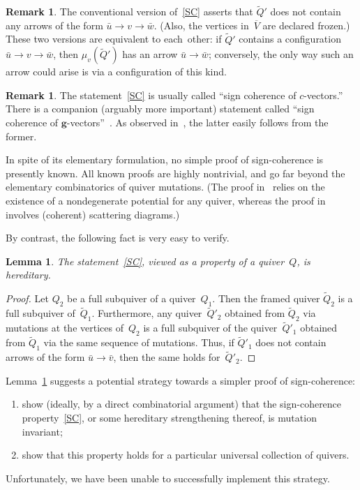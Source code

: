 \documentclass[10pt]{amsart}
\newtheorem{lemma}[theorem]{Lemma}
\theoremstyle{definition}
\newtheorem{remark}[theorem]{Remark}
\begin{document}

\begin{remark}
The conventional version of~\ref{SC} asserts that $\widetilde Q'$ does not contain any 
arrows of the form $\bar u\to v\to \bar w$. 
(Also, the vertices in~$\overline V$ are declared frozen.) 
These two versions are equivalent to each~other: 
if $\widetilde Q'$ contains a configuration $\bar u\to v\to \bar w$,
then $\mu_v(\widetilde Q')$ has an arrow $\bar u\to \bar w$; conversely, 
the only way such an arrow could arise is via a configuration of this kind. 
\end{remark}

\begin{remark}
The statement~\ref{SC} is usually called ``sign coherence of $c$-vectors.''
There is a companion (arguably more important) statement called
``sign coherence of $\mathbf{g}$-vectors''~\cite{ca4}. 
As observed in~\cite{nakanishi-zelevinsky}, the latter easily follows from the former. 
\end{remark}

In spite of its elementary formulation, no simple proof of sign-coherence is presently known. 
All known proofs are highly nontrivial, 
and go far beyond the elementary combinatorics of quiver mutations. 
(The proof in~\cite{DWZ2} relies on the existence of a nondegenerate potential for any quiver,
whereas the proof in~\cite{GHKK} involves (coherent) scattering diagrams.) 

By contrast, the following fact is very easy to verify. 

\begin{lemma}
\label{lem:sc-hereditary}
The statement~\ref{SC}, viewed as a property of a quiver~$Q$, is hereditary. 
\end{lemma}

\begin{proof}
Let $Q_2$ be a full subquiver of a quiver~$Q_1$.
Then the framed quiver $\widetilde Q_2$ is a full subquiver of~$\widetilde Q_1$.
Furthermore, any quiver~$\widetilde Q'_2$ obtained from $\widetilde Q_2$ 
via mutations at the vertices of~$Q_2$
is a full subquiver of the quiver~$\widetilde Q'_1$ obtained from $\widetilde Q_1$ via the same sequence of mutations.
Thus, if $\widetilde Q'_1$ does not contain arrows of the form $\bar u\to \bar v$,
then the same holds for~$\widetilde Q'_2$. 
\end{proof}

$\!$Lemma~\ref{lem:sc-hereditary} suggests a potential strategy 
towards a simpler proof of sign-coherence:
\begin{enumerate}[label=(\alph*)]
\item\label{sect5_i} %
show (ideally, by a direct combinatorial argument) that the sign-coherence property~\ref{SC}, 
or some hereditary %
strengthening thereof, is mutation inva\-riant; 
\item\label{sect5_ii} %
show that this property holds for a particular universal collection of quivers. 
\end{enumerate}
Unfortunately, we have been unable to successfully implement this strategy. 
\end{document}
